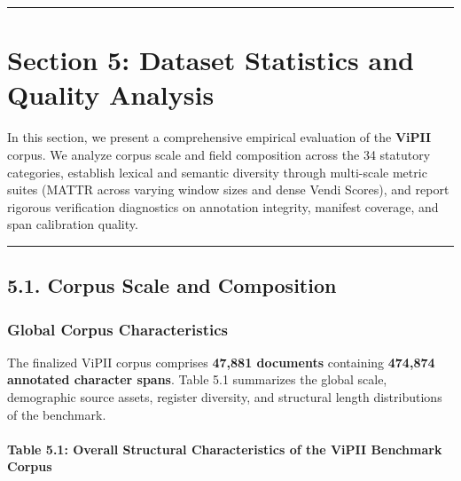 \documentclass[
]{article}
\begin{document}
\begin{center}\rule{0.5\linewidth}{0.5pt}\end{center}

\section{Section 5: Dataset Statistics and Quality
Analysis}\label{section-5-dataset-statistics-and-quality-analysis}

In this section, we present a comprehensive empirical evaluation of the
\textbf{ViPII} corpus. We analyze corpus scale and field composition
across the 34 statutory categories, establish lexical and semantic
diversity through multi-scale metric suites (MATTR across varying window
sizes and dense Vendi Scores), and report rigorous verification
diagnostics on annotation integrity, manifest coverage, and span
calibration quality.

\begin{center}\rule{0.5\linewidth}{0.5pt}\end{center}

\subsection{5.1. Corpus Scale and
Composition}\label{corpus-scale-and-composition}

\subsubsection{Global Corpus
Characteristics}\label{global-corpus-characteristics}

The finalized ViPII corpus comprises \textbf{47,881 documents}
containing \textbf{474,874 annotated character spans}. Table 5.1
summarizes the global scale, demographic source assets, register
diversity, and structural length distributions of the benchmark.

\paragraph{Table 5.1: Overall Structural Characteristics of the ViPII
Benchmark
Corpus}\label{table-5.1-overall-structural-characteristics-of-the-vipii-benchmark-corpus}
\end{document}
